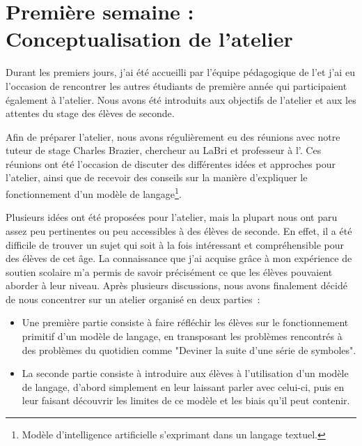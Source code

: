 \section{Première semaine : Conceptualisation de l'atelier}
  Durant les premiers jours, j'ai été accueilli par l'équipe pédagogique de l'\enseirb et j'ai eu l'occasion de rencontrer les autres étudiants de première année qui participaient également à l'atelier. Nous avons été introduits aux objectifs de l'atelier et aux les attentes du stage des élèves de seconde. \par
 Afin de préparer l'atelier, nous avons régulièrement eu des réunions avec notre tuteur de stage Charles Brazier, chercheur au LaBri et professeur à l'\enseirb. Ces réunions ont été l'occasion de discuter des différentes idées et approches pour l'atelier, ainsi que de recevoir des conseils sur la manière d'expliquer le fonctionnement d'un modèle de langage\footnote{Modèle d'intelligence artificielle s'exprimant dans un langage textuel.}. \par
 Plusieurs idées ont été proposées pour l'atelier, mais la plupart nous ont paru assez peu pertinentes ou peu accessibles à des élèves de seconde. En effet, il a été difficile de trouver un sujet qui soit à la fois intéressant et compréhensible pour des élèves de cet âge. La connaissance que j'ai acquise grâce à mon expérience de soutien scolaire m'a permis de savoir précisément ce que les élèves pouvaient aborder à leur niveau. Après plusieurs discussions, nous avons finalement décidé de nous concentrer sur un atelier organisé en deux parties~:
\begin{itemize}
  \item Une première partie consiste à faire réfléchir les élèves sur le fonctionnement primitif d'un modèle de langage, en transposant les problèmes rencontrés à des problèmes du quotidien comme "Deviner la suite d'une série de symboles".

  \item La seconde partie consiste à introduire aux élèves à l'utilisation d'un modèle de langage, d'abord simplement en leur laissant parler avec celui-ci, puis en leur faisant découvrir les limites de ce modèle et les biais qu'il peut contenir. 
\end{itemize}

